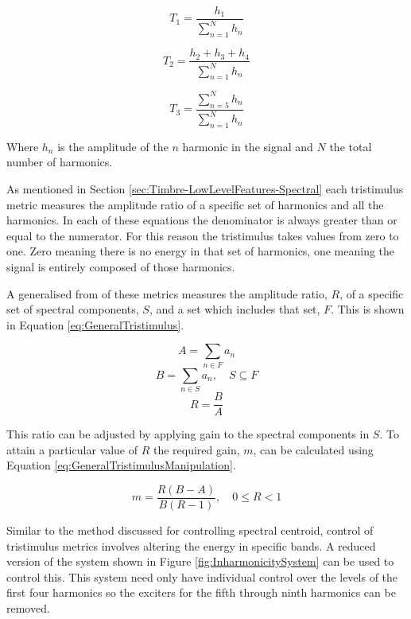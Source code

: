 		\begin{equation}
			T_{1} = \frac{h_{1}}{\sum_{n = 1}^{N} h_{n}}
			\label{eq:Tristimulus1}
		\end{equation}

		\begin{equation}
			T_{2} = \frac{h_{2} + h_{3} + h_{4}}{\sum_{n = 1}^{N} h_{n}}
			\label{eq:Tristimulus2}
		\end{equation}

		\begin{equation}
			T_{3} = \frac{\sum_{n = 5}^{N} h_{n}}{\sum_{n = 1}^{N} h_{n}}
			\label{eq:Tristimulus3}
		\end{equation}

		Where $h_{n}$ is the amplitude of the $n$ harmonic in the signal and $N$ the total number of
		harmonics.

		As mentioned in Section \ref{sec:Timbre-LowLevelFeatures-Spectral} each tristimulus metric measures the
		amplitude ratio of a specific set of harmonics and all the harmonics. In each of these equations the
		denominator is always greater than or equal to the numerator. For this reason the tristimulus takes values
		from zero to one. Zero meaning there is no energy in that set of harmonics, one meaning the signal is
		entirely composed of those harmonics.

		A generalised from of these metrics measures the amplitude ratio, $R$, of a specific set of spectral
		components, $S$, and a set which includes that set, $F$. This is shown in Equation
		\ref{eq:GeneralTristimulus}.

		\[ A = \sum_{n \in F} a_{n} \]
		\[ B = \sum_{n \in S} a_{n}, \quad S \subseteq F \]
		\begin{equation}
			R = \frac{B}{A}
			\label{eq:GeneralTristimulus}
		\end{equation}

		This ratio can be adjusted by applying gain to the spectral components in $S$. To attain a particular value
		of $R$ the required gain, $m$, can be calculated using Equation \ref{eq:GeneralTristimulusManipulation}.

		\begin{equation}
			m = \frac{R(B - A)}{B(R - 1)}, \quad 0 \leq R < 1
			\label{eq:GeneralTristimulusManipulation}
		\end{equation}

		Similar to the method discussed for controlling spectral centroid, control of tristimulus metrics involves
		altering the energy in specific bands. A reduced version of the system shown in Figure
		\ref{fig:InharmonicitySystem} can be used to control this. This system need only have individual control
		over the levels of the first four harmonics so the exciters for the fifth through ninth harmonics can be
		removed.

